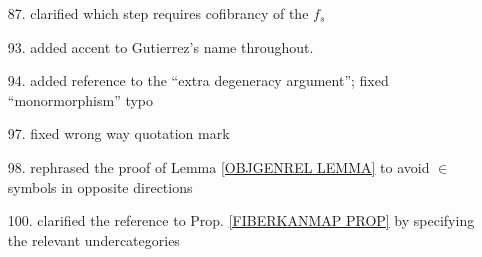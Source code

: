 \documentclass{article}
\begin{document}
\begin{itemize}
\item[87.] clarified which step requires cofibrancy of the 
$f_s$

\item[93.] added accent to Gutierrez's name throughout.

\item[94.] added \cite{Ri14} reference to the ``extra degeneracy argument''; fixed ``monormorphism'' typo

\item[97.] fixed wrong way quotation mark

\item[98.] rephrased the proof of Lemma \ref{OBJGENREL LEMMA}
to avoid $\in$ symbols in opposite directions

\item[100.] clarified the reference to Prop. \ref{FIBERKANMAP PROP} by specifying the relevant undercategories

\end{itemize}








{}


\end{document}
